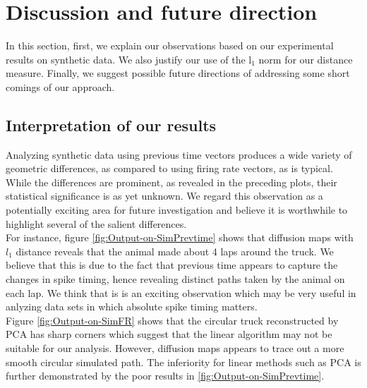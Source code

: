 \section{Discussion and future direction}
In this section, first, we explain our observations based on our experimental
results on synthetic data. We also justify our use of the l$_{1}$ norm for our distance measure. Finally, we suggest possible future directions of addressing some short comings of our approach.


\subsection{Interpretation of our results}
Analyzing synthetic data using previous time vectors produces a wide variety of geometric differences, as compared to  using firing rate vectors, as is typical.
While the differences are prominent, as revealed in the preceding plots, their 
statistical significance is as yet unknown. We regard this observation as a potentially exciting area for future investigation and believe it is worthwhile 
to highlight several of the salient differences.\\


For instance, figure \ref{fig:Output-on-SimPrevtime} shows that diffusion maps with $l_{1}$ distance reveals that the animal made about 4 laps around the truck.
We believe that this is due to the fact that previous time appears to capture the changes in spike timing, hence revealing distinct paths taken by the animal on each lap. We think that is is an exciting observation which may be very useful
in anlyzing data sets in which absolute spike timing matters.\\


Figure \ref{fig:Output-on-SimFR} shows that the circular truck reconstructed by PCA has sharp corners which suggest that the linear algorithm may not be
suitable for our analysis. However, diffusion maps appears to trace out a more smooth circular simulated path. The inferiority for linear methods such as PCA
is further demonstrated by the poor results in  \ref{fig:Output-on-SimPrevtime}.\\



